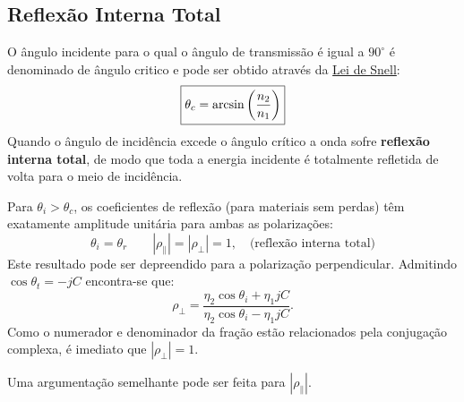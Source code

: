 \clearpage
\subsection{Reflexão Interna Total}

O ângulo incidente para o qual o ângulo de transmissão é igual a $90^\circ$ é denominado de ângulo critico e pode ser obtido através da \hyperref[subsubsec:lei-de-snell]{Lei de Snell}:
\begin{equation}
    \boxed{%
        \theta_c = \arcsin\left( \frac{n_2}{n_1} \right)
    }
\end{equation}
Quando o ângulo de incidência excede o ângulo crítico a onda sofre \textbf{reflexão interna total}, de modo que toda a energia incidente é totalmente refletida de volta para o meio de incidência.

Para $\theta_i > \theta_c$, os coeficientes de reflexão (para materiais sem perdas) têm exatamente amplitude unitária para ambas as polarizações:
\begin{equation}
\theta_i = \theta_r\qquad |\rho_{\parallel}| = |\rho_{\perp}| = 1, \quad \text{(reflexão interna total)}
\end{equation}
Este resultado pode ser depreendido para a polarização perpendicular. Admitindo $\cos\theta_t = -jC$ encontra-se que:
\begin{equation}
    \rho_{\perp} = \frac{\eta_2 \cos\theta_i + \eta_1 jC}{\eta_2 \cos\theta_i - \eta_1 jC}.
\end{equation}
Como o numerador e denominador da fração estão relacionados pela conjugação complexa, é imediato que $|\rho_{\perp}| = 1$.

Uma argumentação semelhante pode ser feita para $|\rho_{\parallel}|$.

